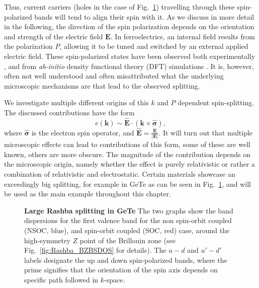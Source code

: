 Thus, current carriers (holes in the case of Fig.~\ref{fig:Rashba_intro_dispersion}) travelling through these spin-polarized bands will tend to align their spin with it.
As we discuss in more detail in the following, the direction of the spin polarization depends on the orientation and strength of the electric field $\mathbf{E}$. In ferroelectrics, an internal field results from the polarization $P$, allowing it to be tuned and switched by an external applied electric field. These spin-polarized states have been observed both experimentally \cite{Ishizaka2011,Liebmann2016,Krempasky2015SurfaceSemiconductor}, and from {\it ab-initio} density functional theory (DFT) simulations \cite{DiSante2013}. It is, however, often not well understood and often misattributed what the underlying microscopic mechanisms are that lead to the observed splitting.

We investigate multiple different origins of this $k$ and $P$ dependent spin-splitting. The discussed contributions have the form
\begin{equation}
	\label{eq:Rashba_form}
	e(\mathbf{k}) \sim \hat{\mathbf{E}} \cdot (\mathbf{k} \times \hat{\mathbf{\sigma}}),
\end{equation}
where $\hat{\mathbf{\sigma}}$ is the electron spin operator, and $\hat{{\mathbf{E}}}=\frac{\mathbf{E}}{|\mathbf{E}|}$. It will turn out that multiple microscopic effects can lead to contributions of this form, some of these are well known, others are  more obscure. The magnitude of the contribution depends on the microscopic origin, namely whether the effect is purely relativistic or rather a combination of relativistic and electrostatic. Certain materials showcase an exceedingly big splitting, for example in GeTe as can be seen in Fig.~\ref{fig:Rashba_intro_dispersion}, and will be used as the main example throughout this chapter.
\begin{figure}[h]
	\caption{\label{fig:Rashba_intro_dispersion}
		{\bf Large Rashba splitting in GeTe} The two graphs show the band dispersions for the first valence band for the non spin-orbit coupled (NSOC, blue), and spin-orbit coupled (SOC, red) case, around the high-symmetry $Z$ point of the Brillouin zone (see Fig.~\ref{fig:Rashba_BZBSDOS} for details). The $u-d$ and $u'-d'$ labels designate the up and down spin-polarized bands, where the prime signifies that the orientation of the spin axis depends on specific path followed in $k$-space. 
	}
\end{figure}

